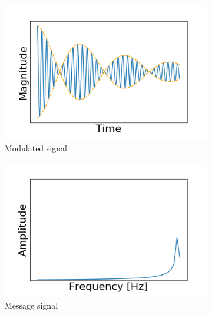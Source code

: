 \documentclass[]{article}
\begin{document}
\begin{figure}[h!]
\begin{subfigure}[b]{0.3\textwidth}
		\includegraphics[width=\textwidth]{figs/amplitude_modulation/dsb/modulated_signal.png}
		\caption{Modulated signal}
		\label{fig:dsb_modulated_signal}
	\end{subfigure}
	\begin{subfigure}[b]{0.3\textwidth}
		\includegraphics[width=\textwidth]{figs/amplitude_modulation/dsb/message_signal_freq.png}
		\caption{Message signal}
		\label{fig:dsb_message_signal_freq}
	\end{subfigure}
	~ %
	\begin{subfigure}[b]{0.3\textwidth}

\end{subfigure}
\end{figure}
\end{document}
